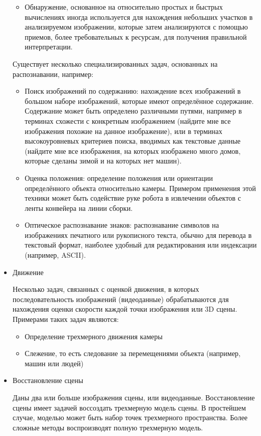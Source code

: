 \documentclass[a4paper,14pt]{extreport}
\begin{document}
\begin{itemize}
\begin{itemize}
		\item Обнаружение, основанное на относительно простых и быстрых вычислениях иногда используется для нахождения небольших участков в анализируемом изображении, которые затем анализируются с помощью приемов, более требовательных к ресурсам, для получения правильной интерпретации.
	\end{itemize}
	Существует несколько специализированных задач, основанных на распознавании, например:
	\begin{itemize}
	\item Поиск изображений по содержанию: нахождение всех изображений в большом наборе изображений, которые имеют определённое содержание. Содержание может быть определено различными путями, например в терминах схожести с конкретным изображением (найдите мне все изображения похожие на данное изображение), или в терминах высокоуровневых критериев поиска, вводимых как текстовые данные (найдите мне все изображения, на которых изображено много домов, которые сделаны зимой и на которых нет машин).
	\item Оценка положения: определение положения или ориентации определённого объекта относительно камеры. Примером применения этой техники может быть содействие руке робота в извлечении объектов с ленты конвейера на линии сборки.
	\item Оптическое распознавание знаков: распознавание символов на изображениях печатного или рукописного текста, обычно для перевода в текстовый формат, наиболее удобный для редактирования или индексации (например, ASCII).	
	\end{itemize}	
	
	\item Движение
		
	Несколько задач, связанных с оценкой движения, в которых последовательность изображений (видеоданные) обрабатываются для нахождения оценки скорости каждой точки изображения или 3D сцены. Примерами таких задач являются:
	\begin{itemize}
		\item Определение трехмерного движения камеры
		\item Слежение, то есть следование за перемещениями объекта (например, машин или людей)
		
	\end{itemize}
	\item Восстановление сцены
	
	Даны два или больше изображения сцены, или видеоданные. Восстановление сцены имеет задачей воссоздать трехмерную модель сцены. В простейшем случае, моделью может быть набор точек трехмерного пространства. Более сложные методы воспроизводят полную трехмерную модель.
	

\end{itemize}
\end{document}
